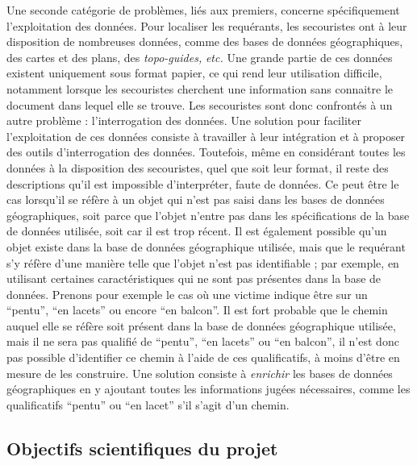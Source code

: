 Une seconde catégorie de problèmes, liés aux premiers, concerne
spécifiquement l'exploitation des données. Pour localiser les
requérants, les secouristes ont à leur disposition de nombreuses
données, comme des bases de données géographiques, des cartes et des
plans, des \emph{topo-guides,} \emph{etc.} Une grande partie de ces
données existent uniquement sous format papier, ce qui rend leur
utilisation difficile, notamment lorsque les secouristes cherchent une
information sans connaitre le document dans lequel elle se trouve. Les
secouristes sont donc confrontés à un autre problème : l'interrogation
des données. Une solution pour faciliter l'exploitation de ces données
consiste à travailler à leur intégration et à proposer des outils
d'interrogation des données. Toutefois, même en considérant toutes les
données à la disposition des secouristes, quel que soit leur format,
il reste des descriptions qu'il est impossible d'interpréter, faute de
données. Ce peut être le cas lorsqu'il se réfère à un objet qui n'est
pas saisi dans les bases de données géographiques, soit parce que
l'objet n'entre pas dans les spécifications de la base de données
utilisée, soit car il est trop récent. Il est également possible qu'un
objet existe dans la base de données géographique utilisée, mais que
le requérant s'y réfère d'une manière telle que l'objet n'est pas
identifiable ; par exemple, en utilisant certaines caractéristiques
qui ne sont pas présentes dans la base de données. Prenons pour
exemple le cas où une victime indique être sur un \enquote{pentu},
\enquote{en lacets} ou encore \enquote{en balcon}. Il est fort
probable que le chemin auquel elle se réfère soit présent dans la base
de données géographique utilisée, mais il ne sera pas qualifié de
\enquote{pentu}, \enquote{en lacets} ou \enquote{en balcon}, il n'est
donc pas possible d'identifier ce chemin à l'aide de ces
qualificatifs, à moins d'être en mesure de les construire. Une
solution consiste à \emph{enrichir} les bases de données géographiques
en y ajoutant toutes les informations jugées nécessaires, comme les
qualificatifs \enquote{pentu} ou \enquote{en lacet} s'il s'agit d'un
chemin.

\subsection{Objectifs scientifiques du projet}
\label{subsec:1-2-3}

